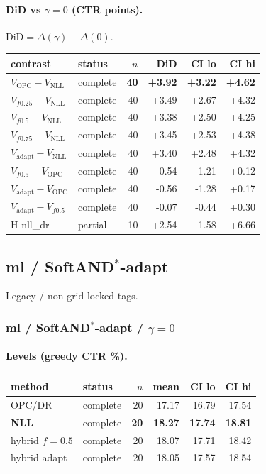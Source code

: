 \documentclass[10pt,a4paper]{article}
\begin{document}
\paragraph{DiD vs $\gamma=0$ (CTR points).} $\mathrm{DiD}=\Delta(\gamma)-\Delta(0)$.
{\centering\small\begin{tabular}{llrrrr}
\toprule contrast & status & $n$ & DiD & CI lo & CI hi \\
\midrule
\textbf{$V_{\mathrm{OPC}}-V_{\mathrm{NLL}}$} & complete & \textbf{40} & \textbf{+3.92} & \textbf{+3.22} & \textbf{+4.62} \\
$V_{f0.25}-V_{\mathrm{NLL}}$ & complete & 40 & +3.49 & +2.67 & +4.32 \\
$V_{f0.5}-V_{\mathrm{NLL}}$ & complete & 40 & +3.38 & +2.50 & +4.25 \\
$V_{f0.75}-V_{\mathrm{NLL}}$ & complete & 40 & +3.45 & +2.53 & +4.38 \\
$V_{\mathrm{adapt}}-V_{\mathrm{NLL}}$ & complete & 40 & +3.40 & +2.48 & +4.32 \\
$V_{f0.5}-V_{\mathrm{OPC}}$ & complete & 40 & -0.54 & -1.21 & +0.12 \\
$V_{\mathrm{adapt}}-V_{\mathrm{OPC}}$ & complete & 40 & -0.56 & -1.28 & +0.17 \\
$V_{\mathrm{adapt}}-V_{f0.5}$ & complete & 40 & -0.07 & -0.44 & +0.30 \\
H-nll\_dr & partial & 10 & +2.54 & -1.58 & +6.66 \\
\bottomrule\end{tabular}\par}
\bigskip
\newpage
\subsection{ml / SoftAND$^*$-adapt}
Legacy / non-grid locked tags.
\subsubsection{ml / SoftAND$^*$-adapt / $\gamma=0$}
\paragraph{Levels (greedy CTR \%).}
{\centering\small\begin{tabular}{llrrrr}
\toprule method & status & $n$ & mean & CI lo & CI hi \\
\midrule
OPC/DR & complete & 20 & 17.17 & 16.79 & 17.54 \\
\textbf{NLL} & complete & \textbf{20} & \textbf{18.27} & \textbf{17.74} & \textbf{18.81} \\
hybrid $f{=}0.5$ & complete & 20 & 18.07 & 17.71 & 18.42 \\
hybrid adapt & complete & 20 & 18.05 & 17.57 & 18.54 \\
\bottomrule\end{tabular}\par}
\end{document}
